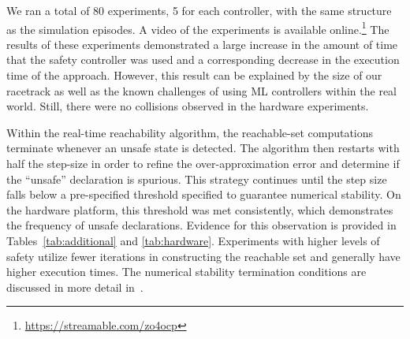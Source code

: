\documentclass[manuscript,screen,review]{acmart}
\begin{document}



We ran a total of 80 experiments, 5 for each controller, with the same structure as the simulation episodes. A video of the experiments is available online.\footnote{\url{https://streamable.com/zo4ocp}} The results of these experiments demonstrated a large increase in the amount of time that the safety controller was used and a corresponding decrease in the execution time of the approach. However, this result can be explained by the size of our racetrack as well as the known challenges of using ML controllers within the real world. Still, there were no collisions observed in the hardware experiments.

Within the real-time reachability algorithm, the reachable-set computations terminate whenever an unsafe state is detected. The algorithm then restarts with half the step-size in order to refine the over-approximation error and determine if the ``unsafe'' declaration is spurious. This strategy continues until the step size falls below a pre-specified threshold specified to guarantee numerical stability. On the hardware platform, this threshold was met consistently, which demonstrates the frequency of unsafe declarations. Evidence for this observation is provided in Tables~\ref{tab:additional} and \ref{tab:hardware}. Experiments with higher levels of safety utilize fewer iterations in constructing the reachable set and generally have higher execution times. 
The numerical stability termination conditions are discussed in more detail in~\cite{Johnson2016}.
\end{document}
